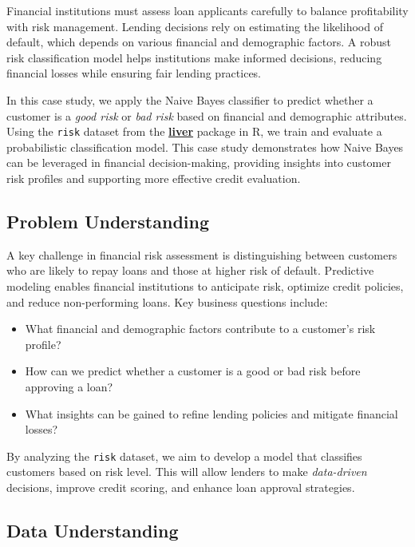 \documentclass[
  11pt,
]{book}
\newcommand{\passthrough}[1]{#1}
\providecommand{\tightlist}{%
  \setlength{\itemsep}{0pt}\setlength{\parskip}{0pt}}
\theoremstyle{definition}
\theoremstyle{definition}
\theoremstyle{definition}
\theoremstyle{definition}
\theoremstyle{remark}
\begin{document}
Financial institutions must assess loan applicants carefully to balance profitability with risk management. Lending decisions rely on estimating the likelihood of default, which depends on various financial and demographic factors. A robust risk classification model helps institutions make informed decisions, reducing financial losses while ensuring fair lending practices.

In this case study, we apply the Naive Bayes classifier to predict whether a customer is a \emph{good risk} or \emph{bad risk} based on financial and demographic attributes. Using the \passthrough{\lstinline!risk!} dataset from the \href{https://CRAN.R-project.org/package=liver}{\textbf{liver}} package in R, we train and evaluate a probabilistic classification model. This case study demonstrates how Naive Bayes can be leveraged in financial decision-making, providing insights into customer risk profiles and supporting more effective credit evaluation.

\subsection*{Problem Understanding}\label{problem-understanding-2}


A key challenge in financial risk assessment is distinguishing between customers who are likely to repay loans and those at higher risk of default. Predictive modeling enables financial institutions to anticipate risk, optimize credit policies, and reduce non-performing loans. Key business questions include:

\begin{itemize}
\tightlist
\item
  What financial and demographic factors contribute to a customer's risk profile?\\
\item
  How can we predict whether a customer is a good or bad risk before approving a loan?\\
\item
  What insights can be gained to refine lending policies and mitigate financial losses?
\end{itemize}

By analyzing the \passthrough{\lstinline!risk!} dataset, we aim to develop a model that classifies customers based on risk level. This will allow lenders to make \emph{data-driven} decisions, improve credit scoring, and enhance loan approval strategies.

\subsection*{Data Understanding}\label{data-understanding-1}
\end{document}
